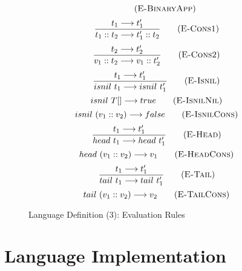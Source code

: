 \documentclass{report}
\begin{document}
\begin{figure}
\begin{multicols}{2}
\begin{equation}
    \tag{\textsc{E-BinaryApp}}
    \label{ebinaryapp}
    \end{equation}
    \begin{equation}
      \frac{t_1\longrightarrow t_1'}{t_1 :: t_2\longrightarrow t_1' :: t_2}
      \tag{\textsc{E-Cons1}}
      \label{econs1}
    \end{equation}
    \begin{equation}
      \frac{t_2\longrightarrow t_2'}{v_1 :: t_2\longrightarrow v_1 :: t_2'}
      \tag{\textsc{E-Cons2}}
      \label{econs2}
    \end{equation}
    \begin{equation}
      \frac{t_1\longrightarrow t_1'}{isnil~t_1\longrightarrow isnil~t_1'}
      \tag{\textsc{E-Isnil}}
      \label{eisnil}
    \end{equation}
    \begin{equation}
      isnil~T[]\longrightarrow true
      \tag{\textsc{E-IsnilNil}}
      \label{eisnilnil}
    \end{equation}
    \begin{equation}
      isnil~(v_1 :: v_2)\longrightarrow false
      \tag{\textsc{E-IsnilCons}}
      \label{eisnilcons}
    \end{equation}
    \begin{equation}
      \frac{t_1\longrightarrow t_1'}{head~t_1\longrightarrow head~t_1'}
      \tag{\textsc{E-Head}}
      \label{ehead}
    \end{equation}
    \begin{equation}
      head~(v_1 :: v_2)\longrightarrow v_1
      \tag{\textsc{E-HeadCons}}
      \label{eheadcons}
    \end{equation}
    \begin{equation}
      \frac{t_1\longrightarrow t_1'}{tail~t_1\longrightarrow tail~t_1'}
      \tag{\textsc{E-Tail}}
      \label{etail}
    \end{equation}
    \begin{equation}
      tail~(v_1 :: v_2)\longrightarrow v_2
      \tag{\textsc{E-TailCons}}
      \label{etailcons}
    \end{equation}
  \end{multicols}
  \caption{Language Definition (3): Evaluation Rules}
  \label{evaluation}
\end{figure}

\section{Language Implementation}
\end{document}
